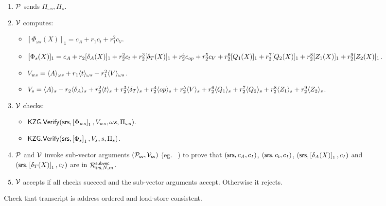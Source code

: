 \begin{figure}[htbp]
\begin{mdframed}
{\begin{enumerate}[leftmargin=1em, label=\arabic*]
\begin{itemize}
            \end{itemize}
            \item $\prover$ sends $\Pi_{\omega s}, \Pi_{s}$.
            \item $\verifier$ computes:
            \begin{itemize}
                \item $[\Phi_{\omega s}(X)]_1= c_A +r_1 c_t + r_1^2 c_V$.
                \item $[\Phi_{s}(X)]_1= c_A +r_2 [\delta_A(X)]_1 + r_2^2 c_t +r_2^3 [\delta_T(X)]_1 +r_2^4 c_{\op} +r_2^5 c_V +r_2^6 [Q_1(X)]_1 +r_2^7 [Q_2(X)]_1 +r_2^8 [Z_1(X)]_1 +
                r_2^9 [Z_2(X)]_1 $.
                \item $V_{ws}= \val{\omega s}{A}+r_1 \val{\omega s}{t}+ r_1^2 \val{\omega s}{V}$.
                \item $V_s=\val{s}{A}+r_2 \val{s}{\delta_A}+r_2^2 \val{s}{t}+r_2^3 \val{s}{\delta_T}+r_2^4 \val{s}{\op}
                +r_2^5 \val{s}{V} +r_2^6 \val{s}{Q_1} +r_2^7 \val{s}{Q_2}+r_2^8 \val{s}{Z_1} +r_2^9 \val{s}{Z_2}$.
            \end{itemize}
            \item $\verifier$ checks:
            \begin{itemize}
                \item $\KZGverify(\srs, \gone{\Phi_{ws}}, V_{ws}, \omega s, \Pi_{\omega s})$.
                \item $\KZGverify(\srs, \gone{\Phi_{s}}, V_{s}, s, \Pi_{s})$.
            \end{itemize}

            \item $\prover$ and $\verifier$ invoke sub-vector arguments $(\subvecprover,\subvecverifier)$ (eg. ~\cite{EPRINT:EagFioGab22})
            to prove that $(\srs,c_A,c_I)$, $(\srs,c_t,c_I)$, $(\srs,\gone{\delta_A(X)},c_I)$ and $(\srs,\gone{\delta_T(X)},c_I)$
            are in $\RSVEC$.

            \item $\verifier$ accepts if all checks succeed and the sub-vector arguments accept. Otherwise it rejects.
        \end{enumerate}
    }
    \end{mdframed}

    \caption{Check that transcript is address ordered and load-store consistent.}
    \label{fig:encoded-relations}
\end{figure}


